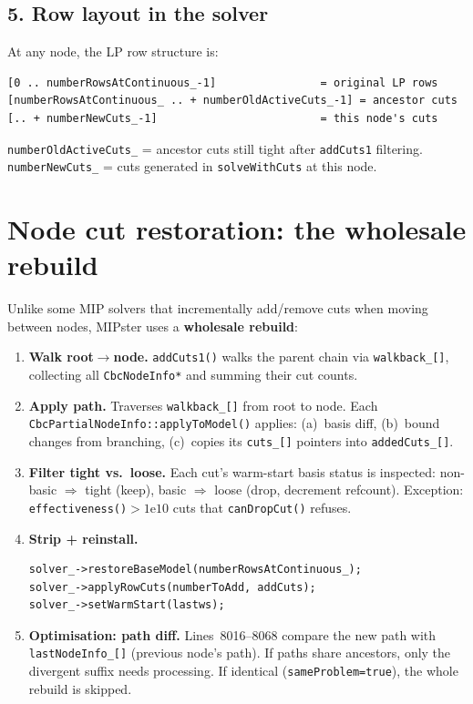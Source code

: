 \documentclass[11pt,a4paper]{article}
\begin{document}
\subsection*{5. Row layout in the solver}

At any node, the LP row structure is:

\begin{lstlisting}
[0 .. numberRowsAtContinuous_-1]                = original LP rows
[numberRowsAtContinuous_ .. + numberOldActiveCuts_-1] = ancestor cuts
[.. + numberNewCuts_-1]                         = this node's cuts
\end{lstlisting}

\texttt{numberOldActiveCuts\_} = ancestor cuts still tight after
\texttt{addCuts1} filtering.  \texttt{numberNewCuts\_} = cuts
generated in \texttt{solveWithCuts} at this node.

\section{Node cut restoration: the wholesale rebuild}
\label{sec:restore}

Unlike some MIP solvers that incrementally add/remove cuts when
moving between nodes, MIPster uses a \textbf{wholesale rebuild}:

\begin{enumerate}[leftmargin=*]
  \item \textbf{Walk root$\to$node.}
        \texttt{addCuts1()} walks the parent chain via
        \texttt{walkback\_[]}, collecting all \texttt{CbcNodeInfo*}
        and summing their cut counts.

  \item \textbf{Apply path.}
        Traverses \texttt{walkback\_[]} from root to node.  Each
        \texttt{CbcPartialNodeInfo::applyToModel()} applies:
        (a)~basis diff, (b)~bound changes from branching,
        (c)~copies its \texttt{cuts\_[]} pointers into
        \texttt{addedCuts\_[]}.

  \item \textbf{Filter tight vs.\ loose.}
        Each cut's warm-start basis status is inspected:
        non-basic $\Rightarrow$ tight (keep), basic $\Rightarrow$
        loose (drop, decrement refcount).  Exception:
        \texttt{effectiveness()$>1\mathrm{e}10$} cuts that
        \texttt{canDropCut()} refuses.

  \item \textbf{Strip + reinstall.}
\begin{lstlisting}
solver_->restoreBaseModel(numberRowsAtContinuous_);
solver_->applyRowCuts(numberToAdd, addCuts);
solver_->setWarmStart(lastws);
\end{lstlisting}

  \item \textbf{Optimisation: path diff.}
        Lines~8016--8068 compare the new path with
        \texttt{lastNodeInfo\_[]} (previous node's path).  If paths
        share ancestors, only the divergent suffix needs processing.
        If identical (\texttt{sameProblem=true}), the whole rebuild
        is skipped.
\end{enumerate}
\end{document}
